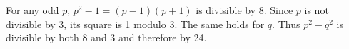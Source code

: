 For any odd $p$, $p^2-1=(p-1)(p+1)$ is divisible by 8. Since $p$ is not divisible by 3, its square is 1 modulo 3. The same holds for $q$. Thus $p^2-q^2$ is divisible by both 8 and 3 and therefore by 24.
